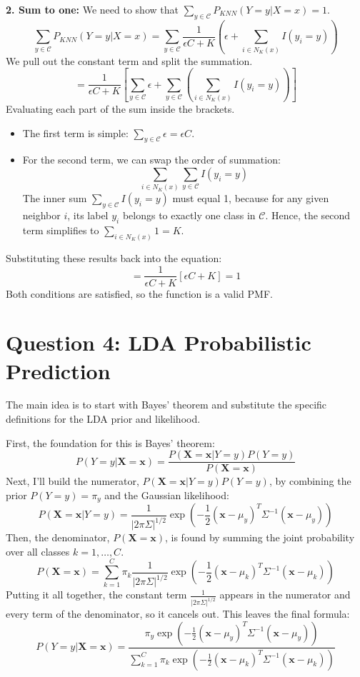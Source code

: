 \documentclass[11pt]{article}
\begin{document}
\medskip
\noindent
\textbf{2. Sum to one:}
\noindent
We need to show that $\sum_{y \in \mathcal{C}} P_{KNN}(Y=y|X=x) = 1$.
\[
\sum_{y \in \mathcal{C}} P_{KNN}(Y=y|X=x) = \sum_{y \in \mathcal{C}} \frac{1}{\epsilon C + K} \left(\epsilon + \sum_{i \in N_K(x)} I(y_i = y) \right)
\]
We pull out the constant term and split the summation.
\[
= \frac{1}{\epsilon C + K} \left[ \sum_{y \in \mathcal{C}} \epsilon + \sum_{y \in \mathcal{C}} \left( \sum_{i \in N_K(x)} I(y_i = y) \right) \right]
\]
Evaluating each part of the sum inside the brackets.
\begin{itemize}
    \item The first term is simple: $\sum_{y \in \mathcal{C}} \epsilon = \epsilon C$.
    \item For the second term, we can swap the order of summation:
    \[
    \sum_{i \in N_K(x)} \sum_{y \in \mathcal{C}} I(y_i = y)
    \]
    The inner sum $\sum_{y \in \mathcal{C}} I(y_i = y)$ must equal 1, because for any given neighbor $i$, its label $y_i$ belongs to exactly one class in $\mathcal{C}$. Hence, the second term simplifies to $\sum_{i \in N_K(x)} 1 = K$.
\end{itemize}
Substituting these results back into the equation:
\[
= \frac{1}{\epsilon C + K} \left[ \epsilon C + K \right] = 1
\]
Both conditions are satisfied, so the function is a valid PMF.

\section*{Question 4: LDA Probabilistic Prediction}

\noindent
The main idea is to start with Bayes' theorem and substitute the specific definitions for the LDA prior and likelihood.

\medskip
\noindent
First, the foundation for this is Bayes' theorem:
\[
P(Y=y|\mathbf{X}=\mathbf{x}) = \frac{P(\mathbf{X}=\mathbf{x}|Y=y)P(Y=y)}{P(\mathbf{X}=\mathbf{x})}
\]
Next, I'll build the numerator, $P(\mathbf{X}=\mathbf{x}|Y=y)P(Y=y)$, by combining the prior $P(Y=y) = \pi_y$ and the Gaussian likelihood:
\[
P(\mathbf{X}=\mathbf{x}|Y=y) = \frac{1}{|2\pi\Sigma|^{1/2}} \exp\left(-\frac{1}{2}(\mathbf{x}-\mu_y)^T \Sigma^{-1}(\mathbf{x}-\mu_y)\right)
\]
Then, the denominator, $P(\mathbf{X}=\mathbf{x})$, is found by summing the joint probability over all classes $k=1, \dots, C$.
\[
P(\mathbf{X}=\mathbf{x}) = \sum_{k=1}^{C} \pi_k \frac{1}{|2\pi\Sigma|^{1/2}} \exp\left(-\frac{1}{2}(\mathbf{x}-\mu_k)^T \Sigma^{-1}(\mathbf{x}-\mu_k)\right)
\]
Putting it all together, the constant term $\frac{1}{|2\pi\Sigma|^{1/2}}$ appears in the numerator and every term of the denominator, so it cancels out. This leaves the final formula:
\[
P(Y=y|\mathbf{X}=\mathbf{x}) = \frac{\pi_y \exp\left(-\frac{1}{2}(\mathbf{x}-\mu_y)^T \Sigma^{-1}(\mathbf{x}-\mu_y)\right)}{\sum_{k=1}^{C} \pi_k \exp\left(-\frac{1}{2}(\mathbf{x}-\mu_k)^T \Sigma^{-1}(\mathbf{x}-\mu_k)\right)}
\]
\end{document}
